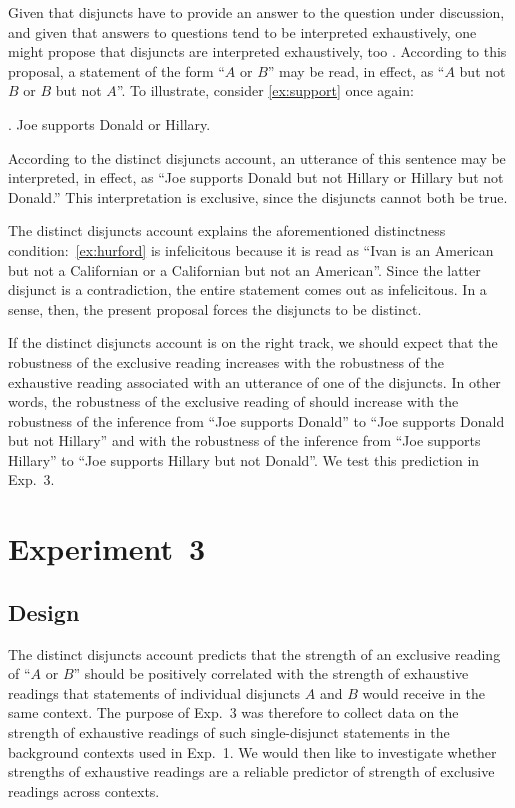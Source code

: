 \documentclass[12pt]{article}
\begin{document}
Given that disjuncts have to provide an answer to the question under discussion, and given that answers to questions tend to be interpreted exhaustively, one might propose that disjuncts are interpreted exhaustively, too \citep{fox2007,ZimmermannFreeChoiceDisjunction2000}. According to this proposal, a statement of the form ``$A$ or $B$'' may be read, in effect, as ``$A$ but not $B$ or $B$ but not $A$''. To illustrate, consider \ref{ex:support} once again:

\ex.	Joe supports Donald or Hillary.

According to the distinct disjuncts account, an utterance of this sentence may be interpreted, in effect, as ``Joe supports Donald but not Hillary or Hillary but not Donald.'' This interpretation is exclusive, since the disjuncts cannot both be true.

The distinct disjuncts account explains the aforementioned distinctness condition:\ \ref{ex:hurford} is infelicitous because it is read as ``Ivan is an American but not a Californian or a Californian but not an American''. Since the latter disjunct is a contradiction, the entire statement comes out as infelicitous. In a sense, then, the present proposal forces the disjuncts to be distinct.

If the distinct disjuncts account is on the right track, we should expect that the robustness of the exclusive reading increases with the robustness of the exhaustive reading associated with an utterance of one of the disjuncts. In other words, the robustness of the exclusive reading of \Last should increase with the robustness of the inference from ``Joe supports Donald'' to ``Joe supports Donald but not Hillary'' and with the robustness of the inference from ``Joe supports Hillary'' to ``Joe supports Hillary but not Donald''. We test this prediction in Exp.\ 3.

\section{Experiment~3}

\subsection{Design}

The distinct disjuncts account predicts that the strength of an exclusive reading of ``$A$ or $B$'' should be positively correlated with the strength of exhaustive readings that statements of individual disjuncts $A$ and $B$ would receive in the same context. The purpose of Exp.~3 was therefore to collect data on the strength of
exhaustive readings of such single-disjunct statements in the background contexts used in
Exp.~1. We would then like to investigate whether strengths of exhaustive readings are a
reliable predictor of strength of exclusive readings across contexts.
\end{document}
